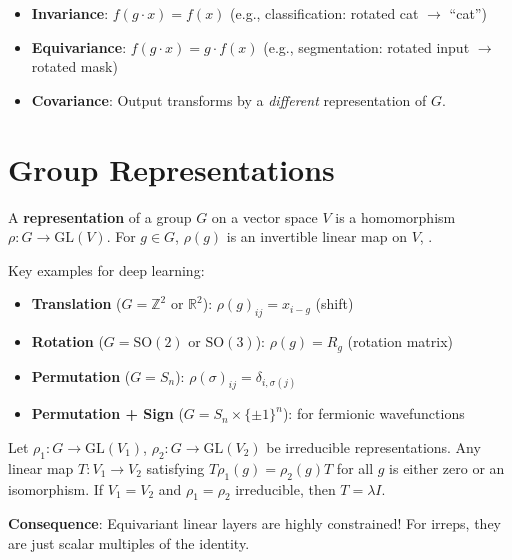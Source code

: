 \begin{itemize}
    \item \textbf{Invariance}: $f(g \cdot x) = f(x)$ (e.g., classification: rotated cat $\to$ ``cat'')
    \item \textbf{Equivariance}: $f(g \cdot x) = g \cdot f(x)$ (e.g., segmentation: rotated input $\to$ rotated mask)
    \item \textbf{Covariance}: Output transforms by a \emph{different} representation of $G$.
\end{itemize}

\section{Group Representations}
\label{sec:eq:reps}

\begin{definition}
A \textbf{representation} of a group $G$ on a vector space $V$ is a homomorphism $\rho: G \to \mathrm{GL}(V)$. For $g \in G$, $\rho(g)$ is an invertible linear map on $V$, \cite{lim2023equivariant}.
\end{definition}

Key examples for deep learning:
\begin{itemize}
    \item \textbf{Translation} ($G = \mathbb{Z}^2$ or $\mathbb{R}^2$): $\rho(g)_{ij} = x_{i-g}$ (shift)
    \item \textbf{Rotation} ($G = \mathrm{SO}(2)$ or $\mathrm{SO}(3)$): $\rho(g) = R_g$ (rotation matrix)
    \item \textbf{Permutation} ($G = S_n$): $\rho(\sigma)_{ij} = \delta_{i, \sigma(j)}$
    \item \textbf{Permutation + Sign} ($G = S_n \times \{\pm 1\}^n$): for fermionic wavefunctions
\end{itemize}

\begin{theorem}
Let $\rho_1: G \to \mathrm{GL}(V_1)$, $\rho_2: G \to \mathrm{GL}(V_2)$ be irreducible representations. Any linear map $T: V_1 \to V_2$ satisfying $T \rho_1(g) = \rho_2(g) T$ for all $g$ is either zero or an isomorphism. If $V_1 = V_2$ and $\rho_1 = \rho_2$ irreducible, then $T = \lambda I$.
\end{theorem}

\textbf{Consequence}: Equivariant linear layers are highly constrained! For irreps, they are just scalar multiples of the identity.

